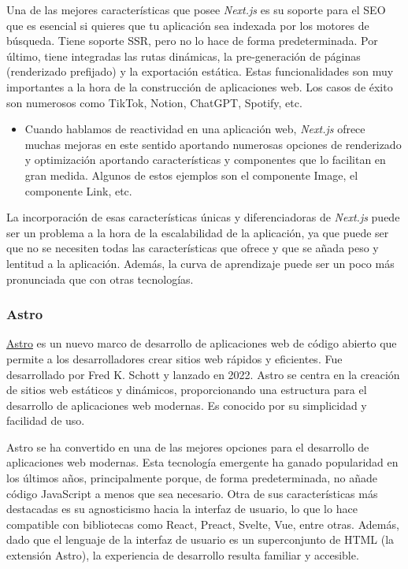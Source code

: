 Una de las mejores características que posee \textit{Next.js} es su soporte para el SEO que es esencial si quieres que tu aplicación sea indexada por los motores de búsqueda. Tiene soporte SSR, pero no lo hace de forma predeterminada. Por último, tiene integradas las rutas dinámicas, la pre-generación de páginas (renderizado prefijado) y la exportación estática. Estas funcionalidades son muy importantes a la hora de la construcción de aplicaciones web. Los casos de éxito son numerosos como TikTok, Notion, ChatGPT, Spotify, etc.

\begin{itemize}
    \item[\bien] Cuando hablamos de reactividad en una aplicación web, \textit{Next.js} ofrece muchas mejoras en este sentido aportando numerosas opciones de renderizado y optimización aportando características y componentes que lo facilitan en gran medida. Algunos de estos ejemplos son el componente Image, el componente Link, etc.
\end{itemize}

La incorporación de esas características únicas y diferenciadoras de \textit{Next.js} puede ser un problema a la hora de la escalabilidad de la aplicación, ya que puede ser que no se necesiten todas las características que ofrece y que se añada peso y lentitud a la aplicación. Además, la curva de aprendizaje puede ser un poco más pronunciada que con otras tecnologías.

\subsubsection{Astro}

\href{https://astro.build/}{Astro} es un nuevo marco de desarrollo de aplicaciones web de código abierto que permite a los desarrolladores crear sitios web rápidos y eficientes. Fue desarrollado por Fred K. Schott y lanzado en 2022. Astro se centra en la creación de sitios web estáticos y dinámicos, proporcionando una estructura para el desarrollo de aplicaciones web modernas. Es conocido por su simplicidad y facilidad de uso.

Astro se ha convertido en una de las mejores opciones para el desarrollo de aplicaciones web modernas. Esta tecnología emergente ha ganado popularidad en los últimos años, principalmente porque, de forma predeterminada, no añade código JavaScript a menos que sea necesario. Otra de sus características más destacadas es su agnosticismo hacia la interfaz de usuario, lo que lo hace compatible con bibliotecas como React, Preact, Svelte, Vue, entre otras. Además, dado que el lenguaje de la interfaz de usuario es un superconjunto de HTML (la extensión Astro), la experiencia de desarrollo resulta familiar y accesible.

